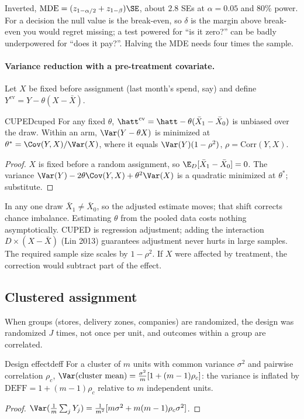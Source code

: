 \documentclass[11pt]{article}
\begin{document}
Inverted, $\text{MDE} = (z_{1-\alpha/2} + z_{1-\beta})\SE$, about $2.8$ SEs at $\alpha = 0.05$ and 80\% power.
For a decision the null value is the break-even, so $\delta$ is the margin above break-even you would regret
missing; a test powered for ``is it zero?'' can be badly underpowered for ``does it pay?''. Halving the MDE
needs four times the sample.

\paragraph{Variance reduction with a pre-treatment covariate.} Let $X$ be fixed before assignment (last
month's spend, say) and define $Y^{\text{cv}} = Y - \theta(X - \bar X)$.

\begin{prop}{CUPED}{cuped}
For any fixed $\theta$, $\hatt^{\text{cv}} = \hatt - \theta(\bar X_1 - \bar X_0)$ is unbiased over the draw.
Within an arm, $\Var(Y - \theta X)$ is minimized at $\theta^\ast = \Cov(Y,X)/\Var(X)$, where it equals
$\Var(Y)(1-\rho^2)$, $\rho = \mathrm{Corr}(Y, X)$.
\end{prop}
\begin{proof}
$X$ is fixed before a random assignment, so $\E_D[\bar X_1 - \bar X_0] = 0$. The variance
$\Var(Y) - 2\theta\Cov(Y,X) + \theta^2\Var(X)$ is a quadratic minimized at $\theta^\ast$; substitute.
\end{proof}

In any one draw $\bar X_1 \ne \bar X_0$, so the adjusted estimate moves; that shift corrects chance imbalance.
Estimating $\theta$ from the pooled data costs nothing asymptotically. CUPED is regression adjustment; adding
the interaction $D \times (X - \bar X)$ (Lin 2013) guarantees adjustment never hurts in large samples.
The required sample size scales by $1 - \rho^2$. If $X$ were affected by treatment, the correction would
subtract part of the effect.

\subsection{Clustered assignment}

When groups (stores, delivery zones, companies) are randomized, the design was randomized $J$ times, not once
per unit, and outcomes within a group are correlated.

\begin{prop}{Design effect}{deff}
For a cluster of $m$ units with common variance $\sigma^2$ and pairwise correlation $\rho_c$,
$\Var(\text{cluster mean}) = \tfrac{\sigma^2}{m}[1 + (m-1)\rho_c]$: the variance is inflated by
$\text{DEFF} = 1 + (m-1)\rho_c$ relative to $m$ independent units.
\end{prop}
\begin{proof}
$\Var(\tfrac1m\sum_j Y_j) = \tfrac{1}{m^2}[m\sigma^2 + m(m-1)\rho_c\sigma^2]$.
\end{proof}
\end{document}
